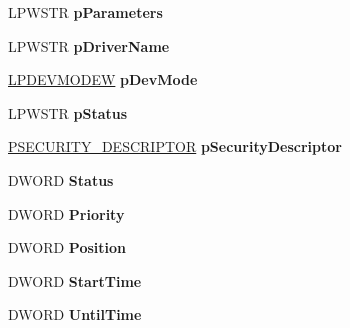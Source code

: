 \begin{DoxyCompactItemize}
\item 
\mbox{\label{struct___j_o_b___i_n_f_o__2_w_a022afc21402e69e1a290301b0a929468}} 
L\+P\+W\+S\+TR {\bfseries p\+Parameters}
\item 
\mbox{\label{struct___j_o_b___i_n_f_o__2_w_ac6b045fb41929a768c684363c7c7018b}} 
L\+P\+W\+S\+TR {\bfseries p\+Driver\+Name}
\item 
\mbox{\label{struct___j_o_b___i_n_f_o__2_w_a6b0aff9d3e411bdbbca76ee5297e98b1}} 
\hyperlink{struct__devicemode_w}{L\+P\+D\+E\+V\+M\+O\+D\+EW} {\bfseries p\+Dev\+Mode}
\item 
\mbox{\label{struct___j_o_b___i_n_f_o__2_w_af49d809b83cfd7db09fe3f0c8605bdae}} 
L\+P\+W\+S\+TR {\bfseries p\+Status}
\item 
\mbox{\label{struct___j_o_b___i_n_f_o__2_w_a5a91d0338c65531ad724758e04fd645f}} 
\hyperlink{struct___s_e_c_u_r_i_t_y___d_e_s_c_r_i_p_t_o_r}{P\+S\+E\+C\+U\+R\+I\+T\+Y\+\_\+\+D\+E\+S\+C\+R\+I\+P\+T\+OR} {\bfseries p\+Security\+Descriptor}
\item 
\mbox{\label{struct___j_o_b___i_n_f_o__2_w_ac12b783e307ecd6417fb055629a86eea}} 
D\+W\+O\+RD {\bfseries Status}
\item 
\mbox{\label{struct___j_o_b___i_n_f_o__2_w_aefbb523038d4ba50303ba1087871fb5d}} 
D\+W\+O\+RD {\bfseries Priority}
\item 
\mbox{\label{struct___j_o_b___i_n_f_o__2_w_a68a1a9cca2b4b3792f7be4c21a6f56fd}} 
D\+W\+O\+RD {\bfseries Position}
\item 
\mbox{\label{struct___j_o_b___i_n_f_o__2_w_a0b58245737333c7db91fac7c83b1177f}} 
D\+W\+O\+RD {\bfseries Start\+Time}
\item 
\mbox{\label{struct___j_o_b___i_n_f_o__2_w_a2279ba8db0f633df563c7bb58de94de5}} 
D\+W\+O\+RD {\bfseries Until\+Time}
\item 

\end{DoxyCompactItemize}
